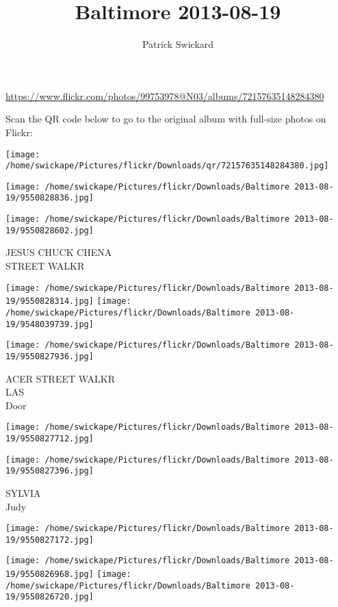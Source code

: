 \documentclass[10pt,letterpaper]{article}
\title{Baltimore 2013-08-19}
\author{Patrick Swickard}
\date{}
\begin{document}
\maketitle

\url{https://www.flickr.com/photos/99753978@N03/albums/72157635148284380}

Scan the QR code below to go to the original album with full-size photos on Flickr:

\texttt{[image: /home/swickape/Pictures/flickr/Downloads/qr/72157635148284380.jpg]}
\pagebreak

\texttt{[image: /home/swickape/Pictures/flickr/Downloads/Baltimore 2013-08-19/9550828836.jpg]}

\vspace{0.25in}
\texttt{[image: /home/swickape/Pictures/flickr/Downloads/Baltimore 2013-08-19/9550828602.jpg]}

JESUS CHUCK CHENA\\
STREET WALKR
\pagebreak

\texttt{[image: /home/swickape/Pictures/flickr/Downloads/Baltimore 2013-08-19/9550828314.jpg]}
\texttt{[image: /home/swickape/Pictures/flickr/Downloads/Baltimore 2013-08-19/9548039739.jpg]}

\texttt{[image: /home/swickape/Pictures/flickr/Downloads/Baltimore 2013-08-19/9550827936.jpg]}

ACER STREET WALKR\\
LAS\\
Door
\pagebreak

\texttt{[image: /home/swickape/Pictures/flickr/Downloads/Baltimore 2013-08-19/9550827712.jpg]}

\vspace{0.25in}
\texttt{[image: /home/swickape/Pictures/flickr/Downloads/Baltimore 2013-08-19/9550827396.jpg]}

SYLVIA\\
Judy
\pagebreak

\texttt{[image: /home/swickape/Pictures/flickr/Downloads/Baltimore 2013-08-19/9550827172.jpg]}

\vspace{0.25in}
\texttt{[image: /home/swickape/Pictures/flickr/Downloads/Baltimore 2013-08-19/9550826968.jpg]}
\texttt{[image: /home/swickape/Pictures/flickr/Downloads/Baltimore 2013-08-19/9550826720.jpg]}
\end{document}
